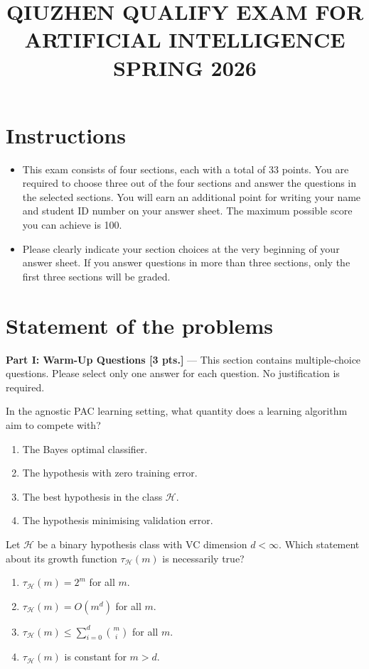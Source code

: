 \documentclass[11pt,a4paper]{article}
\title{\textbf{QIUZHEN QUALIFY EXAM FOR ARTIFICIAL INTELLIGENCE}\\[0.5em]\Large SPRING 2026}
\date{}
\author{}
\newcommand{\examstatement}[1]{%
  \par\addvspace{0.85em}%
  \noindent{\bfseries #1}\par\nobreak\addvspace{0.28em}%
}
\begin{document}
\maketitle
\vspace{-3em}

\tableofcontents

\section{Instructions}
\begin{itemize}
    \item This exam consists of four sections, each with a total of 33 points. You are required to choose three out of the four sections and answer the questions in the selected sections. You will earn an additional point for writing your name and student ID number on your answer sheet. The maximum possible score you can achieve is 100.
    \item Please clearly indicate your section choices at the very beginning of your answer sheet. If you answer questions in more than three sections, only the first three sections will be graded.
\end{itemize}

\section{Statement of the problems}

\par

\noindent\textbf{Part I: Warm-Up Questions [3 pts.]} --- This section contains multiple-choice questions.
Please select only one answer for each question. No justification is required.

\examstatement{Problem MQ1. [0.5 pts.]}
In the agnostic PAC learning setting, what quantity does a learning algorithm aim to compete with?
\begin{enumerate}[label=(\alph*)]
    \item The Bayes optimal classifier.
    \item The hypothesis with zero training error.
    \item The best hypothesis in the class $\mathcal{H}$.
    \item The hypothesis minimising validation error.
\end{enumerate}

\examstatement{Problem MQ2. [0.5 pts.]}
Let $\mathcal{H}$ be a binary hypothesis class with VC dimension $d < \infty$. Which statement about its growth function $\tau_{\mathcal{H}}(m)$ is necessarily true?
\begin{enumerate}[label=(\alph*)]
    \item $\tau_{\mathcal{H}}(m) = 2^m$ for all $m$.
    \item $\tau_{\mathcal{H}}(m) = O(m^d)$ for all $m$.
    \item $\tau_{\mathcal{H}}(m) \le \sum_{i=0}^{d} \binom{m}{i}$ for all $m$.
    \item $\tau_{\mathcal{H}}(m)$ is constant for $m > d$.
\end{enumerate}
\end{document}
